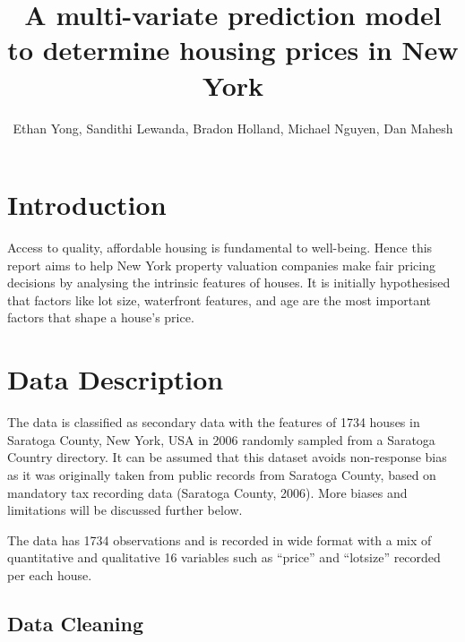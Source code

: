 \documentclass[letterpaper,8pt,twocolumn,twoside,]{pinp}
\title{A multi-variate prediction model to determine housing prices in
New York}
\author[]{Ethan Yong, Sandithi Lewanda, Bradon Holland, Michael Nguyen,
Dan Mahesh}
\begin{document}
\verticaladjustment{-2pt}

\maketitle
\thispagestyle{firststyle}



\section{Introduction}\label{introduction}

Access to quality, affordable housing is fundamental to well-being.
Hence this report aims to help New York property valuation companies
make fair pricing decisions by analysing the intrinsic features of
houses. It is initially hypothesised that factors like lot size,
waterfront features, and age are the most important factors that shape a
house's price.

\section{Data Description}\label{data-description}

The data is classified as secondary data with the features of 1734
houses in Saratoga County, New York, USA in 2006 randomly sampled from a
Saratoga Country directory. It can be assumed that this dataset avoids
non-response bias as it was originally taken from public records from
Saratoga County, based on mandatory tax recording data (Saratoga County,
2006). More biases and limitations will be discussed further below.

The data has 1734 observations and is recorded in wide format with a mix
of quantitative and qualitative 16 variables such as ``price'' and
``lotsize'' recorded per each house.

\subsection{Data Cleaning}\label{data-cleaning}
\end{document}
